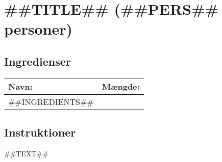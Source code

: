 \section{##TITLE## (##PERS## personer)}

\subsection*{Ingredienser}

\begin{tabular}{|l|l|}
  \hline
  \bf{Navn:} & \bf{Mængde:} \\
  \hline\hline
  ##INGREDIENTS##
  \hline
\end{tabular}

\subsection*{Instruktioner}

##TEXT##

